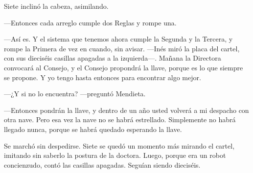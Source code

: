 Siete inclinó la cabeza, asimilando.

---Entonces cada arreglo cumple dos Reglas y rompe una.

---Así es. Y el sistema que tenemos ahora cumple la Segunda y la Tercera, y rompe la Primera de vez en cuando, sin avisar. ---Inés miró la placa del cartel, con sus dieciséis casillas apagadas a la izquierda---\nobreak. Mañana la Directora convocará al Consejo, y el Consejo propondrá la llave, porque es lo que siempre se propone. Y yo tengo hasta entonces para encontrar algo mejor.

---¿Y si no lo encuentra? ---preguntó Mendieta.

---Entonces pondrán la llave, y dentro de un año usted volverá a mi despacho con otra nave. Pero esa vez la nave no se habrá estrellado. Simplemente no habrá llegado nunca, porque se habrá quedado esperando la llave.

Se marchó sin despedirse. Siete se quedó un momento más mirando el cartel, imitando sin saberlo la postura de la doctora. Luego, porque era un robot concienzudo, contó las casillas apagadas. Seguían siendo dieciséis.
